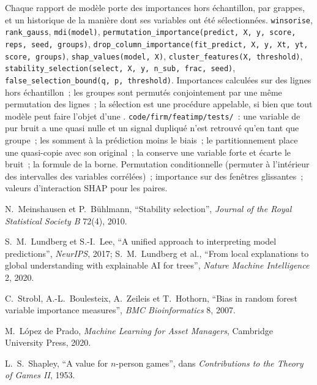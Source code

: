 \begin{build}
 Chaque rapport de modèle porte des importances hors échantillon, par grappes, et un historique de la manière dont ses variables ont été
sélectionnées.
 \texttt{winsorise}, \texttt{rank\_gauss}, \texttt{mdi(model)},
\texttt{permutation\_importance(predict, X, y, score, reps, seed, groups)},
\texttt{drop\_column\_importance(fit\_predict, X, y, Xt, yt, score, groups)}, \texttt{shap\_values(model, X)}, \texttt{cluster\_features(X, threshold)},
\texttt{stability\_selection(select, X, y, n\_sub, frac, seed)}, \texttt{false\_selection\_bound(q, p, threshold)}.
 Importances calculées sur des lignes hors échantillon~; les groupes sont permutés conjointement par une même permutation des lignes~; la sélection
est une procédure appelable, si bien que tout modèle peut faire l'objet d'une .
 \texttt{code/firm/featimp/tests/}~: une variable de pur bruit a une  quasi nulle
et un signal dupliqué n'est retrouvé qu'en tant que groupe~; les  somment à la prédiction moins le biais~; le partitionnement place une
quasi-copie avec son original~; la  conserve une variable forte et écarte le bruit~; la formule de la borne.
 Permutation conditionnelle (permuter à l'intérieur des intervalles des variables corrélées)~; importance sur des
fenêtres glissantes~; valeurs d'interaction SHAP pour les paires.
\end{build}

\begin{omsources}
\item N.~Meinshausen et P.~Bühlmann, ``Stability selection'', \emph{Journal of the Royal Statistical Society B} 72(4),
2010.
\item S.~M.~Lundberg et S.-I.~Lee, ``A unified approach to interpreting model predictions'', \emph{NeurIPS}, 2017;
S.~M.~Lundberg et al., ``From local explanations to global understanding with explainable AI for trees'', \emph{Nature
Machine Intelligence} 2, 2020.
\item C.~Strobl, A.-L.~Boulesteix, A.~Zeileis et T.~Hothorn, ``Bias in random forest variable importance measures'',
\emph{BMC Bioinformatics} 8, 2007.
\item M.~López de Prado, \emph{Machine Learning for Asset Managers}, Cambridge University Press, 2020.
\item L.~S.~Shapley, ``A value for $n$-person games'', dans \emph{Contributions to the Theory of Games II}, 1953.
\end{omsources}

